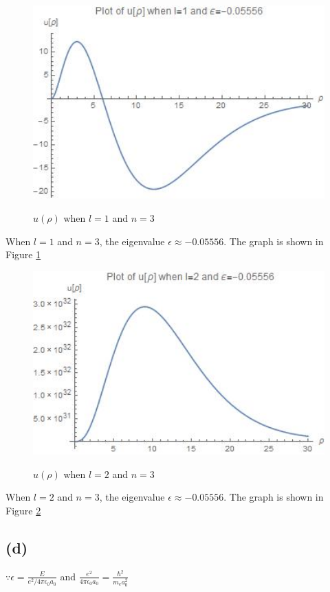 \documentclass[12pt]{article}
\begin{document}
\begin{spacing}{2.0}
\begin{figure}
  \centering
  \includegraphics[width=4.5in]{out8}\\
  \caption{$u(\rho)$ when $l=1$ and $n=3$}\label{out8}
\end{figure}

When $l=1$ and $n=3$, the eigenvalue $\epsilon \approx -0.05556$. The graph is shown in Figure \ref{out8}

\begin{figure}
  \centering
  \includegraphics[width=4.5in]{out9}\\
  \caption{$u(\rho)$ when $l=2$ and $n=3$}\label{out9}
\end{figure}

When $l=2$ and $n=3$, the eigenvalue $\epsilon \approx -0.05556$. The graph is shown in Figure \ref{out9}

\subsection*{(d)}

$\because \epsilon=\frac{E}{e^2/4\pi \epsilon_0 a_0}$ and $\frac{e^2}{4\pi \epsilon_0 a_0}=\frac{\hbar^2}{m_e a_0^2}$


\end{spacing}
\end{document}
